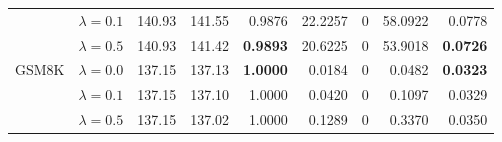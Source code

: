 \begin{table}[t]
{\begin{tabular}{l l rrrrrrr}
 & $\lambda{=}0.1$ & 140.93 & 141.55 & 0.9876 & 22.2257 & \cellcolor{cyan!12} $0$ & 58.0922 & 0.0778 \\
 & $\lambda{=}0.5$ & 140.93 & 141.42 & \textbf{0.9893} & 20.6225 & \cellcolor{cyan!12} $0$ & 53.9018 & \textbf{0.0726} \\
\midrule
GSM8K & $\lambda{=}0.0$ & 137.15 & 137.13 & \textbf{1.0000} & 0.0184 & \cellcolor{cyan!12} $0$ & 0.0482 & \textbf{0.0323} \\
 & $\lambda{=}0.1$ & 137.15 & 137.10 & 1.0000 & 0.0420 & \cellcolor{cyan!12} $0$ & 0.1097 & 0.0329 \\
 & $\lambda{=}0.5$ & 137.15 & 137.02 & 1.0000 & 0.1289 & \cellcolor{cyan!12} $0$ & 0.3370 & 0.0350 \\
\bottomrule
\end{tabular}}
\end{table}